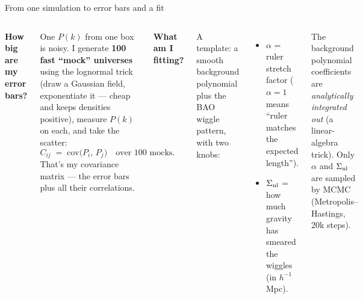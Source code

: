 \documentclass[aspectratio=169,11pt]{beamer}
\begin{document}
\begin{frame}{From one simulation to error bars and a fit}
  \begin{columns}[T]
    \textbf{How big are my error bars?}

    \smallskip
    One $P(k)$ from one box is noisy. I generate
    \textbf{100 fast ``mock'' universes} using the lognormal trick
    (draw a Gaussian field, exponentiate it --- cheap and keeps
    densities positive), measure $P(k)$ on each, and take the
    scatter:
    \[
      C_{ij} \;=\; \text{cov}\bigl(P_i,\,P_j\bigr)
      \quad\text{over 100 mocks.}
    \]
    That's my covariance matrix --- the error bars plus all their
    correlations.

    \textbf{What am I fitting?}

    \smallskip
    A template: a smooth background polynomial plus the BAO wiggle
    pattern, with two knobs:
    \begin{itemize}\itemsep0.15em
      \item $\alpha$ = \alert{ruler stretch factor}
            ($\alpha = 1$ means ``ruler matches the expected length'').
      \item $\Sigma_{\rm nl}$ = \alert{how much gravity has smeared
            the wiggles} (in $h^{-1}$Mpc).
    \end{itemize}

    \smallskip
    The background polynomial coefficients are \emph{analytically
    integrated out} (a linear-algebra trick).
    \alert{Only $\alpha$ and $\Sigma_{\rm nl}$ are sampled by MCMC}
    (Metropolis--Hastings, 20k steps).
  \end{columns}
\end{frame}
\end{document}
